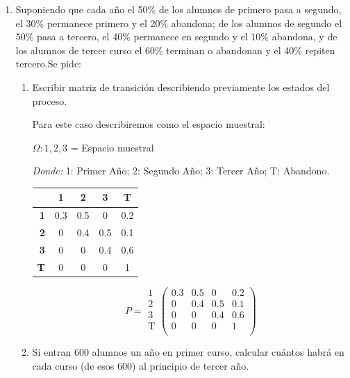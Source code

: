 \documentclass{templateNote}
\begin{document}
\begin{enumerate}
    \item Suponiendo que cada año el 50\% de los alumnos de primero pasa a segundo, el 30\% permanece primero y el 20\% abandona; de los alumnos de segundo el 50\% pasa a tercero, el 40\% permanece en segundo y el 10\% abandona, y de los alumnos de tercer curso el 60\% terminan o abandonan y el 40\% repiten tercero.Se pide:
    \begin{enumerate}[label=\alph*)]
        \item Escribir matriz de transición describiendo previamente los estados del proceso.
        
        Para este caso describiremos como el espacio muestral:
        \begin{center}
            $\Omega: {1,2,3}$ = Espacio muestral\\
        \end{center}
        \textit{Donde:}
        1: Primer Año; 2: Segundo Año; 3: Tercer Año; T: Abandono.\\

        \begin{table}[h]
            \centering
            \begin{tabular}{|r|c|c|c|c|}
            \hline
                                 & \textbf{1}   & \textbf{2}  & \textbf{3} & \textbf{T}\\ \hline
            \textbf{1} & 0.3 & 0.5 & 0 & 0.2\\
            \textbf{2} & 0 & 0.4 & 0.5 & 0.1\\
            \textbf{3} & 0 & 0 & 0.4 & 0.6\\ 
            \textbf{T} & 0 & 0 & 0 & 1\\ \hline
            \end{tabular}
        \end{table}

        \begin{center}
            \[
            P = 
            \begin{array}{l}
            \text{1} \\
            \text{2} \\
            \text{3} \\
            \text{T} \\
            \end{array}
            \left(
            \begin{array}{cccc}
                0.3 & 0.5 & 0 & 0.2 \\
                0 & 0.4 & 0.5 & 0.1 \\
                0 & 0 & 0.4 & 0.6 \\
                0 & 0 & 0 & 1 \\
            \end{array}
            \right)
            \]
        \end{center}
        \item Si entran 600 alumnos un año en primer curso, calcular cuántos habrá en cada curso (de esos 600) al principio de tercer año.


\end{enumerate}
\end{enumerate}
\end{document}
